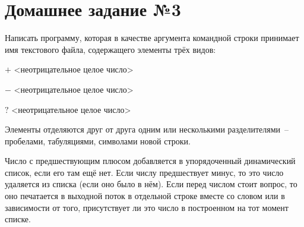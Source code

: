 \section*{Домашнее задание №3}


Написать программу, которая в качестве аргумента командной строки
принимает имя текстового файла, содержащего элементы трёх видов:
\begin{description}
\item{$+$} <неотрицательное целое число>
\item{$-$} <неотрицательное целое число>
\item{$?$} <неотрицательное целое число>
\end{description}

Элементы отделяются друг от друга одним или несколькими
разделителями~-- пробелами, табуляциями, символами новой строки.

Число
с предшествующим плюсом добавляется в упорядоченный динамический
список, если его там ещё нет. Если числу предшествует минус, то это число
удаляется из списка (если оно было в нём). Если перед числом стоит
вопрос, то оно печатается в выходной поток в отдельной строке вместе со
словом  или  в зависимости от того, присутствует ли это число в
построенном на тот момент списке.
